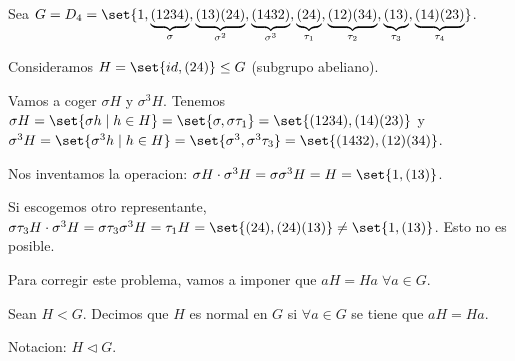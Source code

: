 \begin{example}
	Sea \(G = D_4 = \set{1, \underbrace{(1234)}_{\sigma}, \underbrace{(13)(24)}_{\sigma^{2}}, \underbrace{(1432)}_{\sigma^{3}}, \underbrace{(24)}_{\tau_1}, \underbrace{(12)(34)}_{\tau_2}, \underbrace{(13)}_{\tau_3}, \underbrace{(14)(23)}_{\tau_4}}\).
	
	Consideramos \(H = \set{id, (24)} \leq G\) (subgrupo abeliano).
	
	Vamos a coger \(\sigma H \) y \(\sigma^{3} H \). Tenemos \(\sigma H = \set{\sigma h \mid h \in H } = \set{\sigma, \sigma \tau_1} = \set{(1234), (14)(23)}\) y \(\sigma^{3} H = \set{\sigma^{3} h \mid h \in H } = \set{\sigma^{3}, \sigma^{3} \tau_3  } = \set{(1432), (12)(34)} \).
	
	Nos inventamos la operacion: \(\sigma H \cdot \sigma^{3} H = \sigma \sigma^{3} H = H = \set{1,(13)}   \).
	
	Si escogemos otro representante, \(\sigma \tau_3 H \cdot \sigma^{3} H = \sigma \tau_3 \sigma^{3} H = \tau_1 H = \set{(24),(24)(13)} \neq \set{1,(13)}  \). Esto no es posible.
	
	Para corregir este problema, vamos a imponer que \(aH = Ha \; \forall a \in G \).
\end{example}

\begin{definition}
	Sean \(H < G \). Decimos que \(H \) es normal en \(G \) si \(\forall a \in G \) se tiene que \(aH = Ha \).
	
	Notacion: \(H \vartriangleleft G 	\).
\end{definition}

